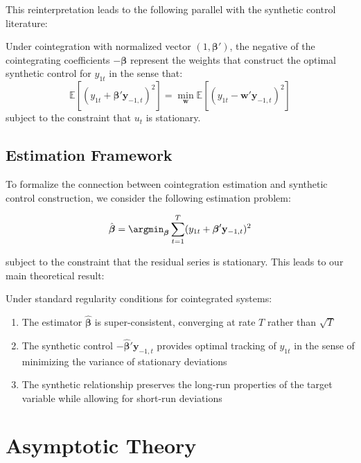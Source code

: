 This reinterpretation leads to the following parallel with the synthetic control literature:

\begin{proposition}
Under cointegration with normalized vector $(1, \boldsymbol{\beta}')$, the negative of the cointegrating coefficients $-\boldsymbol{\beta}$ represent the weights that construct the optimal synthetic control for $y_{1t}$ in the sense that:
\begin{equation}
\mathbb{E}[(y_{1t} + \boldsymbol{\beta}'\mathbf{y}_{-1,t})^2] = \min_{\mathbf{w}} \mathbb{E}[(y_{1t} - \mathbf{w}'\mathbf{y}_{-1,t})^2]
\end{equation}
subject to the constraint that $u_t$ is stationary.
\end{proposition}

\subsection{Estimation Framework}

To formalize the connection between cointegration estimation and synthetic control construction, we consider the following estimation problem:

\begin{equation}
\hat{\boldsymbol{\beta}} = \argmin_{\boldsymbol{\beta}} \sum_{t=1}^T (y_{1t} + \boldsymbol{\beta}'\mathbf{y}_{-1,t})^2
\end{equation}

subject to the constraint that the residual series is stationary. This leads to our main theoretical result:

\begin{theorem}
Under standard regularity conditions for cointegrated systems:
\begin{enumerate}
\item The estimator $\hat{\boldsymbol{\beta}}$ is super-consistent, converging at rate $T$ rather than $\sqrt{T}$
\item The synthetic control $-\hat{\boldsymbol{\beta}}'\mathbf{y}_{-1,t}$ provides optimal tracking of $y_{1t}$ in the sense of minimizing the variance of stationary deviations
\item The synthetic relationship preserves the long-run properties of the target variable while allowing for short-run deviations
\end{enumerate}
\end{theorem}

\section{Asymptotic Theory}

